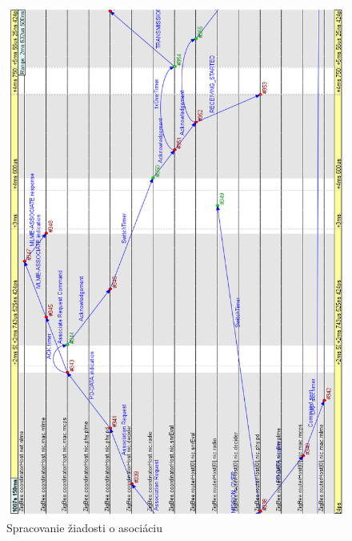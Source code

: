 {\begin{figure}[htbp]
\begin{center}
\includegraphics[width=140mm]{figures/chart_associate_request}
\caption{Spracovanie žiadosti o asociáciu}
\label{fig:chart_associate_request}
\end{center}
\end{figure}
\begin{figure}[htbp]
\begin{center}

\end{center}
\end{figure}}
